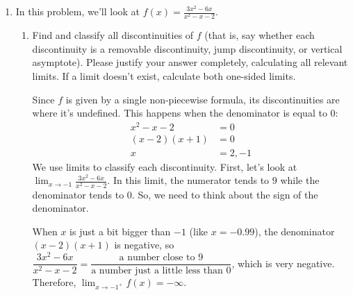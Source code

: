 \documentclass{article}
\theoremstyle{theorem}
\begin{document}
\begin{enumerate}
\begin{enumerate}
\begin{solution}
        This is an underestimate. The exponential decay function is concave up, so the tangent line at any point lies entirely below the curve. \\
    \end{solution}
\end{enumerate}
\newpage

\item {} 

  In this problem, we'll look at $\displaystyle f(x) = \frac{3x^2 -6x}{x^2 - x - 2}$.

  \begin{enumerate}
  \item
    \begin{problem}[\vfill]
      Find and classify all discontinuities of $f$ (that is, say whether each discontinuity is a removable discontinuity, jump discontinuity, or vertical asymptote). Please justify your answer completely, calculating all relevant limits. If a limit doesn't exist, calculate both one-sided limits. 
    \end{problem}

    \begin{solution}
      Since $f$ is given by a single non-piecewise formula, its discontinuities are where it's undefined. This happens when the denominator is equal to 0:
      \begin{align*}
        x^2 - x - 2 &= 0 \\
        (x - 2)(x + 1) &= 0 \\
        x &= 2, -1
      \end{align*}
      We use limits to classify each discontinuity. First, let's look at $\displaystyle \lim_{x \to -1} \frac{3x^2 -6x}{x^2 - x - 2}$. In this limit, the numerator tends to $9$ while the denominator tends to 0. So, we need to think about the sign of the denominator.

      When $x$ is just a bit bigger than $-1$ (like $x = -0.99$), the denominator $(x - 2)(x + 1)$ is negative, so $\dfrac{3x^2 - 6x}{x^2 - x - 2} = \dfrac{\text{a number close to 9}}{\text{a number just a little less than 0}}$, which is very negative. Therefore, $\boxed{\lim_{x \to -1^+} f(x) = -\infty}$.


\end{solution}
\end{enumerate}
\end{enumerate}
\end{document}
